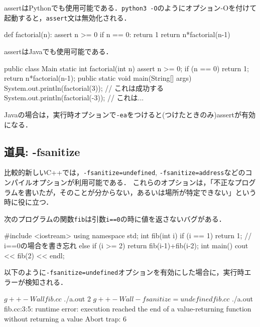 assertはPythonでも使用可能である．\texttt{python3 -O}のようにオプション-Oを付けて起動すると，\texttt{assert}文は無効化される．

\begin{pybox}[emph=assert]
def factorial(n):
    assert n >= 0
    if n == 0:
        return 1
    return n*factorial(n-1)
\end{pybox}

assertはJavaでも使用可能である．
\begin{javabox}[emph={Main,assert}]
public class Main {
    static int factorial(int n) {
	assert n >= 0;
	if (n == 0) return 1;
	return n*factorial(n-1);
    }
    public static void main(String[] args) {
	System.out.println(factorial(3));  // これは成功する
	System.out.println(factorial(-3)); // これは...
    }
}
\end{javabox}

Javaの場合は，実行時オプションで\texttt{-ea}をつけると(つけたときのみ)assertが有効になる．

\subsection{道具: -fsanitize}\label{section:cpp-sanitize}
比較的新しいC++では，\texttt{-fsanitize=undefined}, \texttt{-fsanitize=address}などのコンパイルオプションが利用可能である．
これらのオプションは，「不正なプログラムを書いたが，そのことが分からない，あるいは場所が特定できない」という時に役に立つ．

次のプログラムの関数\texttt{fib}は引数\texttt{i==0}の時に値を返さないバグがある．
\begin{cbox}
#include <iostream>
using namespace std;
int fib(int i) {
  if (i == 1) return 1; // i==0の場合を書き忘れ
  else if (i >= 2) return fib(i-1)+fib(i-2);
}
int main() {
  cout << fib(2) << endl;
}  
\end{cbox}

以下のように\texttt{-fsanitize=undefined}オプションを有効にした場合に，実行時エラーが検知される．
\begin{terminal}[emph={fsanitize,undefined}]
$ g++ -Wall fib.cc
$ ./a.out
2  
$ g++ -Wall -fsanitize=undefined fib.cc
$ ./a.out 
fib.cc:3:5: runtime error: execution reached the end of a value-returning function without returning a value
Abort trap: 6
\end{terminal}

